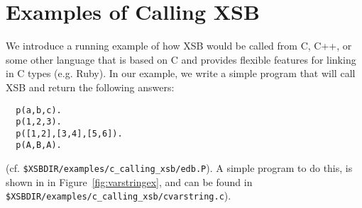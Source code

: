 \section{Examples of Calling XSB}

We introduce a running example of how XSB would be called from C, C++,
or some other language that is based on C and provides flexible
features for linking in C types (e.g. Ruby).  In our example, we write
a simple program that will call XSB and return the following answers:
%
\begin{small}
\begin{verbatim}
  p(a,b,c).
  p(1,2,3).
  p([1,2],[3,4],[5,6]).
  p(A,B,A).
\end{verbatim}
\end{small}
%
(cf. {\tt \$XSBDIR/examples/c\_calling\_xsb/edb.P}).  A simple program
to do this, is shown in in Figure~\ref{fig:varstringex}, and can be
found in {\tt \$XSBDIR/examples/c\_calling\_xsb/cvarstring.c}).
%
